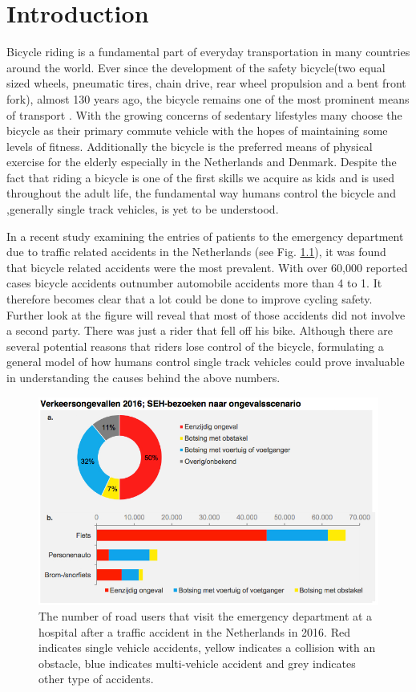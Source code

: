 \chapter{Introduction}
\label{introduction}

Bicycle riding is a fundamental part of everyday transportation in many countries around the world. Ever since the development of the safety bicycle(two equal sized wheels, pneumatic tires, chain drive, rear wheel propulsion and a bent front fork), almost 130 years ago, the bicycle remains  one of the most prominent means of transport \cite{kooijman2013review}. With the growing concerns of sedentary lifestyles many choose the bicycle as their primary commute vehicle with the hopes of maintaining some levels of fitness. Additionally the bicycle is the preferred means of physical exercise for the elderly especially in the Netherlands and Denmark. Despite the fact that riding a bicycle is one of the first skills we acquire as kids and is used throughout the adult life, the fundamental way humans control the bicycle and ,generally single track vehicles,  is yet to be understood.\par
In a recent study examining the entries of patients to the emergency department due to traffic related accidents in the Netherlands (see Fig. \ref{fig:figure1}), it was found that bicycle related accidents were the most prevalent. With over 60,000 reported cases  bicycle accidents outnumber automobile accidents more than 4 to 1. It therefore  becomes clear that a lot could be done to improve cycling safety. Further look at the figure will reveal that most of those accidents did not involve a second party. There was  just a rider that fell off his bike. Although there are several potential reasons that riders lose control of the bicycle, formulating a general model of  how humans control single track vehicles could prove invaluable in understanding the causes behind the above numbers.

\begin{figure}[ht]
    \centering
    \includegraphics[scale=0.8]{images/figure1_1.png}
    \caption[Short title]{The number of road users that visit the emergency department at a hospital after a traffic accident in the Netherlands in 2016. Red indicates single vehicle accidents, yellow indicates a collision with an obstacle, blue indicates multi-vehicle accident and grey indicates other type of accidents\cite{krul_nijman_stam_2016}.}
    \label{fig:figure1}
\end{figure}

